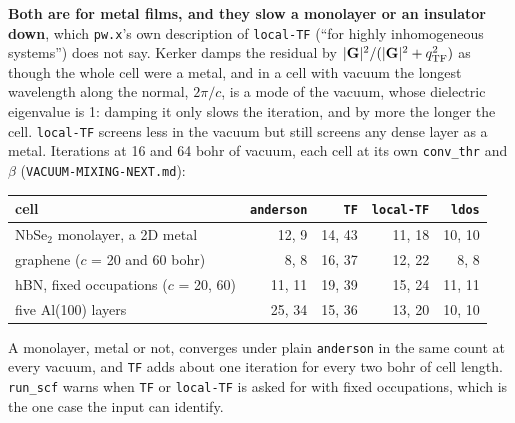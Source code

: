 \documentclass[11pt,a4paper]{article}
\newcommand{\code}[1]{\texttt{\small #1}}
\begin{document}
\textbf{Both are for metal films, and they slow a monolayer or an insulator
down}, which \code{pw.x}'s own description of \code{local-TF} (``for highly
inhomogeneous systems'') does not say. Kerker damps the residual by
$|\mathbf G|^2/(|\mathbf G|^2 + q_{\rm TF}^2)$ as though the whole cell were a metal, and
in a cell with vacuum the longest wavelength along the normal, $2\pi/c$, is a mode of
the vacuum, whose dielectric eigenvalue is 1: damping it only slows the iteration, and
by more the longer the cell. \code{local-TF} screens less in the vacuum but still
screens any dense layer as a metal. Iterations at 16 and 64 bohr of vacuum, each cell
at its own \code{conv\_thr} and $\beta$ (\code{VACUUM-MIXING-NEXT.md}):
\begin{center}
\begin{tabular}{lrrrr}
\toprule
cell & \code{anderson} & \code{TF} & \code{local-TF} & \code{ldos} \\
\midrule
NbSe$_2$ monolayer, a 2D metal & 12, 9 & 14, 43 & 11, 18 & 10, 10 \\
graphene ($c$ = 20 and 60 bohr) & 8, 8 & 16, 37 & 12, 22 & 8, 8 \\
hBN, fixed occupations ($c$ = 20, 60) & 11, 11 & 19, 39 & 15, 24 & 11, 11 \\
five Al(100) layers & 25, 34 & 15, 36 & 13, 20 & 10, 10 \\
\bottomrule
\end{tabular}
\end{center}
A monolayer, metal or not, converges under plain \code{anderson} in the same count at
every vacuum, and \code{TF} adds about one iteration for every two bohr of cell length.
\code{run\_scf} warns when \code{TF} or \code{local-TF} is asked for with fixed
occupations, which is the one case the input can identify.
\end{document}
